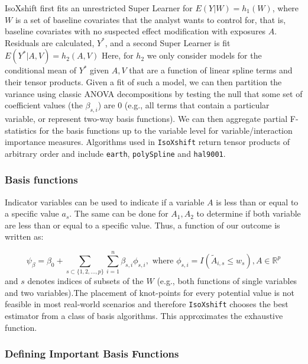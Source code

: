 \documentclass[
]{article}
\begin{document}
IsoXshift first fits an unrestricted Super Learner for
\(E(Y|W) = h_1(W)\), where \(W\) is a set of baseline covariates that
the analyst wants to control for, that is, baseline covariates with no
suspected effect modification with exposures \(A\). Residuals are
calculated, \(Y^*\), and a second Super Learner is fit
\(E(Y^*|A,V) = h_2(A,V)\) Here, for \(h_2\) we only consider models for
the conditional mean of \(Y^*\) given \(A,V\) that are a function of
linear spline terms and their tensor products. Given a fit of such a
model, we can then partition the variance using classic ANOVA
decompositions by testing the null that some set of coefficient values
(the \(\beta_{s,i}\)) are 0 (e.g., all terms that contain a particular
variable, or represent two-way basis functions). We can then aggregate
partial F-statistics for the basis functions up to the variable level
for variable/interaction importance measures. Algorithms used in
\texttt{IsoXshift} return tensor products of arbitrary order and include
\texttt{earth}, \texttt{polySpline} and \texttt{hal9001}.

\hypertarget{basis-functions}{%
\subsubsection{Basis functions}\label{basis-functions}}

Indicator variables can be used to indicate if a variable \(A\) is less
than or equal to a specific value \(a_s\). The same can be done for
\(A_1, A_2\) to determine if both variable are less than or equal to a
specific value. Thus, a function of our outcome is written as:

\[\psi_{\beta} = \beta_0 + \sum_{s\subset \{1,2,...,p\}}\sum_{i=1}^{n} \beta_{s,i} \phi_{s,i},
    \text{ where } \phi_{s,i} = I(\tilde{A}_{i,s} \leq w_s), A \in \mathbb{R}^p\]
and \(s\) denotes indices of subsets of the \(W\) (e.g., both functions
of single variables and two variables).The placement of knot-points for
every potential value is not feasible in most real-world scenarios and
therefore \texttt{IsoXshift} chooses the best estimator from a class of
basis algorithms. This approximates the exhaustive function.

\hypertarget{defining-important-basis-functions}{%
\subsubsection{Defining Important Basis
Functions}\label{defining-important-basis-functions}}
\end{document}

